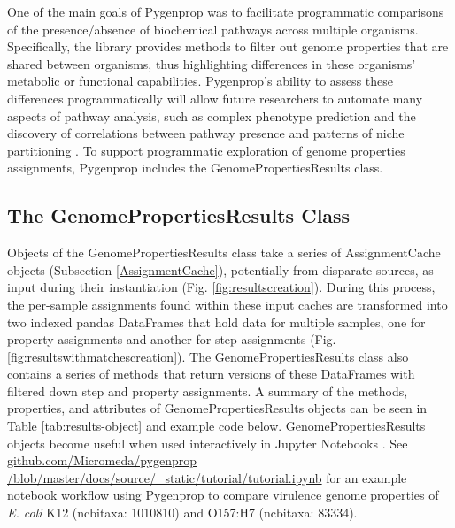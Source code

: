 One of the main goals of Pygenprop was to facilitate programmatic comparisons of 
the presence/absence of biochemical pathways across multiple organisms. 
Specifically, the library provides methods to filter out genome properties that are 
shared between organisms, thus highlighting differences in these organisms' 
metabolic or functional capabilities. Pygenprop's ability to assess these 
differences programmatically will allow future researchers to automate many 
aspects of pathway analysis, such as complex phenotype prediction and the 
discovery of correlations between pathway presence and patterns of niche 
partitioning \cite{finke2008niche}. To support programmatic exploration of 
genome properties assignments, Pygenprop includes the GenomePropertiesResults 
class. 

\subsection{The GenomePropertiesResults Class}

Objects of the GenomePropertiesResults class take a series of AssignmentCache 
objects (Subsection \ref{AssignmentCache}), potentially from disparate sources, 
as input during their instantiation (Fig. \ref{fig:resultscreation}). During 
this process, the per-sample assignments found within these input caches are 
transformed into two indexed pandas DataFrames \cite{mckinney2010data} that hold 
data for multiple samples, one for property assignments and another for step 
assignments (Fig. \ref{fig:resultswithmatchescreation}). The 
GenomePropertiesResults class also contains a series of methods that return 
versions of these DataFrames with filtered down step and property assignments. A 
summary of the methods, properties, and attributes of GenomePropertiesResults 
objects can be seen in Table \ref{tab:results-object} and example code below. 
GenomePropertiesResults objects become useful when used interactively in Jupyter 
Notebooks \cite{kluyver2016jupyter}. See 
\href{http://github.com/Micromeda/pygenprop/blob/master/docs/source/_static/tutorial/tutorial.ipynb}{github.com/Micromeda/pygenprop 
/blob/master/docs/source/\_static/tutorial/tutorial.ipynb} for an example 
notebook workflow using Pygenprop to compare virulence genome properties of 
\textit{E. coli} K12 (\gls{ncbitaxa}: 1010810) and O157:H7 (\gls{ncbitaxa}: 
83334).

